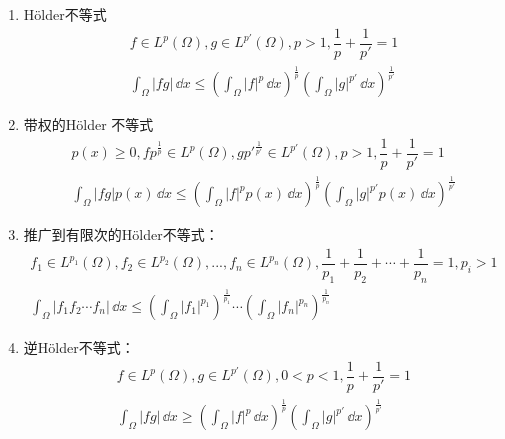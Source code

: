 \begin{enumerate}
    \item H{\"o}lder不等式
    \begin{equation*}
        \begin{aligned}
        f\in L^p(\Omega),g\in L^{p'}(\Omega),p>1,\dfrac{1}{p}+\dfrac{1}{p'}=1\\
        \int_{\Omega}|fg|\,\dd x\leq (\int_{\Omega}|f|^p\,\dd x)^{\frac{1}{p}} (\int_{\Omega}|g|^{p'}\,\dd x)^{\frac{1}{p'}}
        \end{aligned}
    \end{equation*}
    \item 带权的H{\"o}lder 不等式
    \begin{equation*}
        \begin{aligned}
        p(x)\geq 0,fp^{\frac{1}{p}}\in L^p(\Omega),gp'^{\frac{1}{p'}}\in L^{p'}(\Omega),p>1,\dfrac{1}{p}+\dfrac{1}{p'}=1\\
        \int_{\Omega}|fg|p(x)\,\dd x\leq (\int_{\Omega}|f|^p p(x)\,\dd x)^{\frac{1}{p}} (\int_{\Omega}|g|^{p'} p(x)\,\dd x)^{\frac{1}{p'}}
        \end{aligned}
    \end{equation*}
    \item 推广到有限次的H{\"o}lder不等式：
    \begin{equation*}
        \begin{aligned}
            f_1\in L^{p_1}(\Omega),f_2\in L^{p_2}(\Omega),...,f_n\in L^{p_n}(\Omega),\dfrac{1}{p_1}+\dfrac{1}{p_2}+\cdots+\dfrac{1}{p_n}=1,p_i>1\\
            \int_{\Omega}|f_1 f_2\cdots f_n|\, \dd x\leq (\int_{\Omega}|f_1|^{p_1})^{\frac{1}{p_1}}\cdots (\int_{\Omega}|f_n|^{p_n})^{\frac{1}{p_n}}
        \end{aligned}
    \end{equation*}
    \item 逆H{\"o}lder不等式：
    \begin{equation*}
        \begin{aligned}
        f\in L^p(\Omega),g\in L^{p'}(\Omega),0<p<1,\dfrac{1}{p}+\dfrac{1}{p'}=1\\
        \int_{\Omega}|fg|\,\dd x\geq (\int_{\Omega}|f|^p\,\dd x)^{\frac{1}{p}} (\int_{\Omega}|g|^{p'}\,\dd x)^{\frac{1}{p'}}
        \end{aligned}
    \end{equation*}
\end{enumerate}